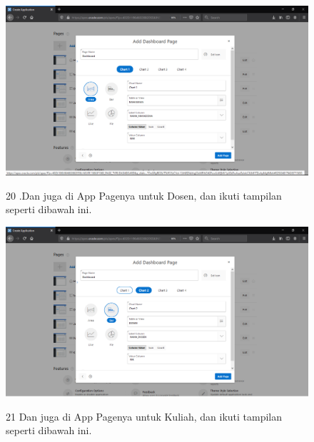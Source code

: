 \begin{enumerate}
\begin{figure}
    \begin{center}
\includegraphics[scale=0.2]{figures/33.png}
    \caption{\textit{}}
        \end{center}
\label{gambar}
\end{figure}


\begin{figure}
\item[20].Dan juga di App Pagenya untuk Dosen, dan ikuti tampilan seperti dibawah ini.

    \begin{center}
\includegraphics[scale=0.2]{figures/34.png}
    \caption{\textit{}}
        \end{center}
\label{gambar}
\end{figure}


\begin{figure}
\item[21]Dan juga di App Pagenya untuk Kuliah, dan ikuti tampilan seperti dibawah ini.


\end{figure}
\end{enumerate}
